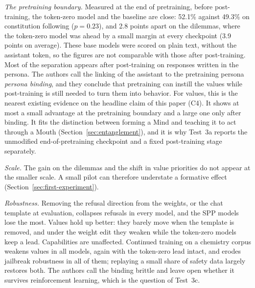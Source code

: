\documentclass[11pt]{article}
\begin{document}
\emph{The pretraining boundary.} Measured at the end of pretraining, before
post-training, the token-zero model and the baseline are close: 52.1\% against
49.3\% on constitution following ($p = 0.23$), and 2.8 points apart on the
dilemmas, where the token-zero model was ahead by a small margin at every
checkpoint (3.9 points on average). These base models were scored on plain
text, without the assistant token, so the figures are not comparable with
those after post-training. Most of the separation appears after post-training
on responses written in the persona. The authors call the linking of the
assistant to the pretraining persona \emph{persona binding}, and they conclude
that pretraining can instill the values while post-training is still needed to
turn them into behavior. For values, this is the nearest existing evidence on
the headline claim of this paper (C4). It shows at most a small advantage at
the pretraining boundary and a large one only after binding. It fits the
distinction between forming a Mind and teaching it to act through a Mouth
(Section~\ref{sec:entanglement}), and it is why Test~3a reports the unmodified
end-of-pretraining checkpoint and a fixed post-training stage separately.

\emph{Scale.} The gain on the dilemmas and the shift in value priorities do not
appear at the smaller scale. A small pilot can therefore understate a
formative effect (Section~\ref{sec:first-experiment}).

\emph{Robustness.} Removing the refusal direction from the weights, or the
chat template at evaluation, collapses refusals in every model, and the SPP
models lose the most. Values hold up better: they barely move when the
template is removed, and under the weight edit they weaken while the
token-zero models keep a lead. Capabilities are unaffected. Continued
training on a chemistry corpus weakens values in all models, again with the
token-zero lead intact, and erodes jailbreak robustness in all of them;
replaying a small share of safety data largely restores both. The authors call the
binding brittle and leave open whether it survives reinforcement learning,
which is the question of Test~3c.
\end{document}
